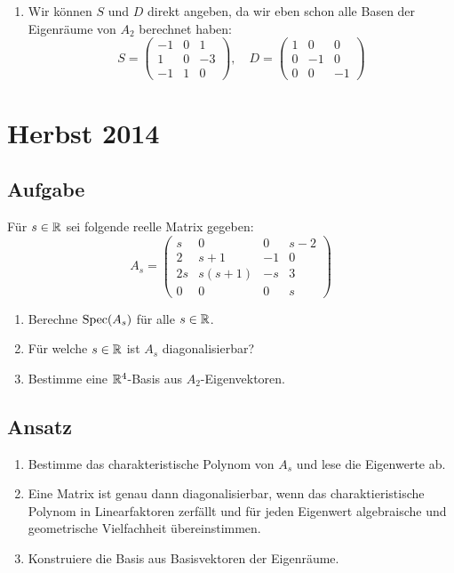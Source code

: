 \begin{enumerate}
	 \item Wir können \( S \) und \( D \) direkt angeben, da wir eben schon alle Basen der Eigenräume von \( A_2 \) berechnet haben:
	 \begin{equation*}
	 	S = \begin{pmatrix}
	 		-1 & 0 & 1 \\
	 		1 & 0 & -3 \\
	 		-1 & 1 & 0
	 	\end{pmatrix}, \quad D = \begin{pmatrix}
	 		1 & 0 & 0 \\
	 		0 & -1 & 0 \\
	 		0 & 0 & -1
	 	\end{pmatrix}
	 \end{equation*}
\end{enumerate}

\newpage

\section{Herbst 2014}

\subsection{Aufgabe}
Für \( s \in \mathbb{R} \) sei folgende reelle Matrix gegeben:
\begin{equation*}
	A_s = \begin{pmatrix}
		s & 0 & 0 & s-2 \\
		2 & s+1 & -1 & 0 \\
		2s & s(s+1) & -s & 3 \\
		0 & 0 & 0 & s
	\end{pmatrix}
\end{equation*}
\begin{enumerate}
	\item Berechne \( \text{Spec}(A_s) \) für alle \( s \in \mathbb{R} \).
	\item Für welche \( s \in \mathbb{R} \) ist \( A_s \) diagonalisierbar?
	\item Bestimme eine \( \mathbb{R}^4 \)-Basis aus \( A_2 \)-Eigenvektoren. 
\end{enumerate}

\subsection{Ansatz}
\begin{enumerate}
	\item Bestimme das charakteristische Polynom von \( A_s \) und lese die Eigenwerte ab.
	\item Eine Matrix ist genau dann diagonalisierbar, wenn das charaktieristische Polynom in Linearfaktoren zerfällt und für jeden Eigenwert algebraische und geometrische Vielfachheit übereinstimmen.
	\item Konstruiere die Basis aus Basisvektoren der Eigenräume. 
\end{enumerate}

